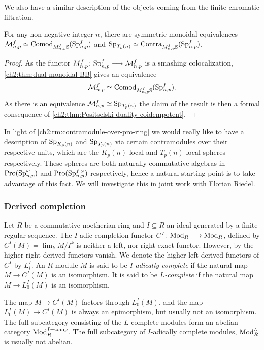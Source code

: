 We also have a similar description of the objects coming from the finite chromatic filtration. 

\begin{proposition}
    For any non-negative integer $n$, there are symmetric monoidal equivalences $\mathcal{M}_{n,p}^f \simeq \mathrm{Comod}_{M_{n,p}^f\mathbb{S}}(\mathrm{Sp}_{n,p}^f)$ and $\mathrm{Sp}_{T_p(n)}\simeq \mathrm{Contra}_{M_{n,p}^f\mathbb{S}}(\mathrm{Sp}_{n,p}^f)$.
\end{proposition}
\begin{proof}
    As the functor $M_{n,p}^f\colon \mathrm{Sp}_{n,p}^f \longrightarrow \mathcal{M}_{n,p}^f$ is a smashing colocalization, \cref{ch2:thm:dual-monoidal-BB} gives an equivalence 
    \[\mathcal{M}_{n,p}^f \simeq \mathrm{Comod}_{M_{n,p}^f \mathbb{S}}(\mathrm{Sp}_{n,p}^f).\]
    As there is an equivalence $\mathcal{M}_{n,p}^f \simeq \mathrm{Sp}_{T_p(n)}$ the claim of the result is then a formal consequence of \cref{ch2:thm:Positselski-duality-coidempotent}.
\end{proof}

\begin{remark}
    In light of \cref{ch2:rm:contramodule-over-pro-ring} we would really like to have a description of $\mathrm{Sp}_{{K_p(n)}}$ and $\mathrm{Sp}_{T_p(n)}$ via certain contramodules over their respective units, which are the $K_p(n)$-local and $T_p(n)$-local spheres respectively. These spheres are both naturally commutative algebras in $\operatorname{Pro}(\mathrm{Sp}_{n,p}^\omega)$ and $\operatorname{Pro}(\mathrm{Sp}_{n,p}^{f, \omega})$ respectively, hence a natural starting point is to take advantage of this fact. We will investigate this in joint work with Florian Riedel. 
\end{remark}

\subsubsection*{Derived completion}
\label{ch2:ssec:derived-completion}

Let $R$ be a commutative noetherian ring and $I\subseteq R$ an ideal generated by a finite regular sequence. The $I$-adic completion functor $C^I\colon \mathrm{Mod}_R \longrightarrow \mathrm{Mod}_R$, defined by $C^I(M)=\lim_k M/I^k$ is neither a left, nor right exact functor. However, by \cite[5.1]{greenlees-may_92} the higher right derived functors vanish. We denote the higher left derived functors of $C^I$ by $L^I_i$. An $R$-module $M$ is said to be \emph{$I$-adically complete} if the natural map $M\to C^I (M)$ is an isomorphism. It is said to be \emph{$L$-complete} if the natural map $M\to L_0^I(M)$ is an isomorphism. 

The map $M\to C^I(M)$ factors through $L_0^I(M)$, and the map $L_0^I(M)\to C^I(M)$ is always an epimorphism, but usually not an isomorphism. The full subcategory consisting of the $L$-complete modules form an abelian category $\mathrm{Mod}_R^{I-\mathrm{comp}}$. The full subcategory of $I$-adically complete modules, $\mathrm{Mod}_R^\wedge$ is usually not abelian. 

